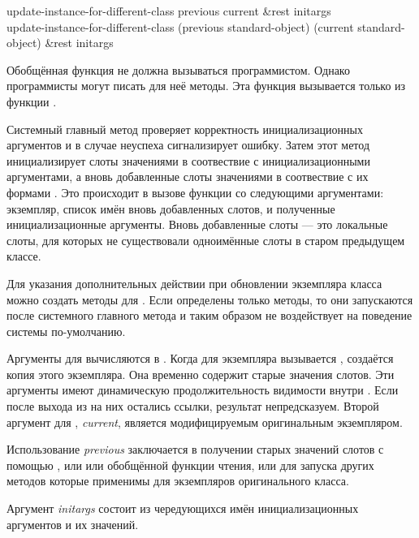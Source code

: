 \begin{defun}
update-instance-for-different-class previous current &rest initargs \\
update-instance-for-different-class (previous standard-object)
     (current standard-object) &rest initargs

Обобщённая функция  не должна
вызываться программистом. Однако программисты могут писать для неё методы. Эта
функция вызывается только из функции .

Системный главный метод  проверяет
корректность инициализационных аргументов и в случае неуспеха сигнализирует
ошибку. Затем этот метод инициализирует слоты значениями в соотвествие с
инициализационными аргументами, а вновь добавленные слоты значениями в
соотвествие с их формами . Это происходит в вызове функции
 со следующими аргументами: экземпляр, список имён вновь
добавленных слотов, и полученные инициализационные аргументы. Вновь добавленные
слоты --- это локальные слоты, для которых не существовали одноимённые слоты в
старом предыдущем классе.

Для указания дополнительных действии при обновлении экземпляра класса можно
создать методы для . Если определены
только  методы, то они запускаются после системного главного метода и
таким образом не воздействует на поведение системы по-умолчанию.

Аргументы для  вычисляются в
. Когда для экземпляра вызывается ,
создаётся копия этого экземпляра. Она временно содержит старые значения
слотов. Эти аргументы имеют динамическую продолжительность видимости внутри
. Если после выхода из
 на них остались ссылки, результат
непредсказуем. Второй аргумент для
, \emph{current}, является
модифицируемым оригинальным экземпляром.

Использование \emph{previous} заключается в получении старых значений слотов с
помощью , или  или обобщённой функции чтения,
или для запуска других методов которые применимы для экземпляров оригинального
класса.

Аргумент \emph{initargs} состоит из чередующихся имён инициализационных
аргументов и их значений.


\end{defun}
